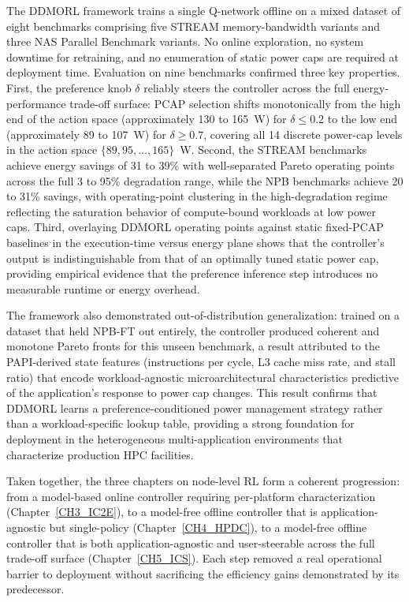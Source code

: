 The DDMORL framework trains a single Q-network offline on a mixed dataset of eight
benchmarks comprising five STREAM memory-bandwidth variants and three NAS Parallel
Benchmark variants.
No online exploration, no system downtime for retraining, and no enumeration of static
power caps are required at deployment time.
Evaluation on nine benchmarks confirmed three key properties.
First, the preference knob $\delta$ reliably steers the controller across the full
energy-performance trade-off surface: PCAP selection shifts monotonically from the
high end of the action space (approximately 130 to 165~W) for $\delta \leq 0.2$ to the
low end (approximately 89 to 107~W) for $\delta \geq 0.7$, covering all 14 discrete
power-cap levels in the action space $\{89, 95, \ldots, 165\}$~W.
Second, the STREAM benchmarks achieve energy savings of 31 to 39\% with well-separated
Pareto operating points across the full 3 to 95\% degradation range, while the NPB
benchmarks achieve 20 to 31\% savings, with operating-point clustering in the
high-degradation regime reflecting the saturation behavior of compute-bound workloads
at low power caps.
Third, overlaying DDMORL operating points against static fixed-PCAP baselines in the
execution-time versus energy plane shows that the controller's output is
indistinguishable from that of an optimally tuned static power cap, providing empirical
evidence that the preference inference step introduces no measurable runtime or energy
overhead.

The framework also demonstrated out-of-distribution generalization: trained on a dataset
that held NPB-FT out entirely, the controller produced coherent and monotone Pareto
fronts for this unseen benchmark, a result attributed to the PAPI-derived state features
(instructions per cycle, L3 cache miss rate, and stall ratio) that encode
workload-agnostic microarchitectural characteristics predictive of the application's
response to power cap changes.
This result confirms that DDMORL learns a preference-conditioned power management
strategy rather than a workload-specific lookup table, providing a strong foundation
for deployment in the heterogeneous multi-application environments that characterize
production HPC facilities.

Taken together, the three chapters on node-level RL form a coherent progression: from
a model-based online controller requiring per-platform characterization (Chapter~\ref{CH3_IC2E}),
to a model-free offline controller that is application-agnostic but single-policy
(Chapter~\ref{CH4_HPDC}), to a model-free offline controller that is both
application-agnostic and user-steerable across the full trade-off surface
(Chapter~\ref{CH5_ICS}).
Each step removed a real operational barrier to deployment without sacrificing the
efficiency gains demonstrated by its predecessor.

